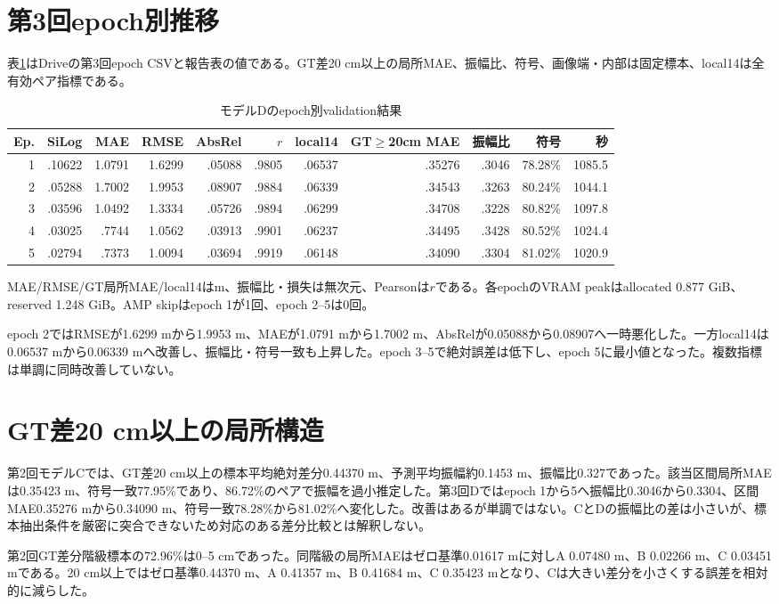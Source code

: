 \section{第3回epoch別推移}
表\ref{tab:epochs}はDriveの第3回epoch CSVと報告表の値である。GT差20 cm以上の局所MAE、振幅比、符号、画像端・内部は固定標本、local14は全有効ペア指標である。
\begin{table}[H]\centering\scriptsize
\caption{モデルDのepoch別validation結果}\label{tab:epochs}
\begin{tabular}{rrrrrrrrrrr}\toprule
Ep.&SiLog&MAE&RMSE&AbsRel&$r$&local14&GT$\geq$20cm MAE&振幅比&符号&秒\\\midrule
1&.10622&1.0791&1.6299&.05088&.9805&.06537&.35276&.3046&78.28\%&1085.5\\
2&.05288&1.7002&1.9953&.08907&.9884&.06339&.34543&.3263&80.24\%&1044.1\\
3&.03596&1.0492&1.3334&.05726&.9894&.06299&.34708&.3228&80.82\%&1097.8\\
4&.03025&.7744&1.0562&.03913&.9901&.06237&.34495&.3428&80.52\%&1024.4\\
5&.02794&.7373&1.0094&.03694&.9919&.06148&.34090&.3304&81.02\%&1020.9\\\bottomrule
\end{tabular}\end{table}
\noindent\small MAE/RMSE/GT局所MAE/local14はm、振幅比・損失は無次元、Pearsonは$r$である。各epochのVRAM peakはallocated 0.877 GiB、reserved 1.248 GiB。AMP skipはepoch 1が1回、epoch 2--5は0回。\normalsize

epoch 2ではRMSEが1.6299 mから1.9953 m、MAEが1.0791 mから1.7002 m、AbsRelが0.05088から0.08907へ一時悪化した。一方local14は0.06537 mから0.06339 mへ改善し、振幅比・符号一致も上昇した。epoch 3--5で絶対誤差は低下し、epoch 5に最小値となった。複数指標は単調に同時改善していない。
\section{GT差20 cm以上の局所構造}
第2回モデルCでは、GT差20 cm以上の標本平均絶対差分0.44370 m、予測平均振幅約0.1453 m、振幅比0.327であった。該当区間局所MAEは0.35423 m、符号一致77.95\%であり、86.72\%のペアで振幅を過小推定した。第3回Dではepoch 1から5へ振幅比0.3046から0.3304、区間MAE0.35276 mから0.34090 m、符号一致78.28\%から81.02\%へ変化した。改善はあるが単調ではない。CとDの振幅比の差は小さいが、標本抽出条件を厳密に突合できないため対応のある差分比較とは解釈しない。

第2回GT差分階級標本の72.96\%は0--5 cmであった。同階級の局所MAEはゼロ基準0.01617 mに対しA 0.07480 m、B 0.02266 m、C 0.03451 mである。20 cm以上ではゼロ基準0.44370 m、A 0.41357 m、B 0.41684 m、C 0.35423 mとなり、Cは大きい差分を小さくする誤差を相対的に減らした。
